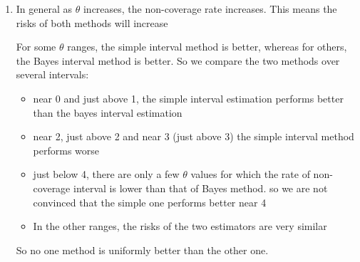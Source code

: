 \documentclass[12pt, a4paper]{article}\usepackage[]{graphicx}\usepackage[]{color}
\begin{document}
\begin{enumerate}[label={\bfseries\arabic*.}]
\begin{Schunk}
{}

\end{Schunk}

\item In general as $\theta$ increases, the non-coverage rate increases. This means the risks of both methods will increase

For some $\theta$ ranges, the simple interval method is better, whereas for others, the Bayes interval method is better. So we compare the two methods over several intervals:

  \begin{itemize}
  \item near 0 and just above 1, the simple interval estimation performs better than the bayes interval estimation
  \item near 2, just above 2 and near 3 (just above 3) the simple interval method performs worse
  \item just below 4, there are only a few $\theta$ values for which the rate of non-coverage interval is lower than that of Bayes method. so we are not convinced that the simple one performs better near 4
  \item In the other ranges, the risks of the two estimators are very similar
  \end{itemize}
So no one method is uniformly better than the other one. 
\end{enumerate}
\end{document}
